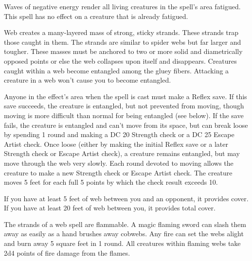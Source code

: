 \begin{multicols}{2}
\begin{small}
\noindent Waves of negative energy render all living creatures in the spell's area fatigued. This spell has no effect on a creature that is already fatigued.

\noindent Web creates a many-layered mass of strong, sticky strands. These strands trap those caught in them. The strands are similar to spider webs but far larger and tougher. These masses must be anchored to two or more solid and diametrically opposed points or else the web collapses upon itself and disappears. Creatures caught within a web become entangled among the gluey fibers. Attacking a creature in a web won't cause you to become entangled.

\smallskip\noindent Anyone in the effect's area when the spell is cast must make a Reflex save. If this save succeeds, the creature is entangled, but not prevented from moving, though moving is more difficult than normal for being entangled (see below). If the save fails, the creature is entangled and can't move from its space, but can break loose by spending 1 round and making a DC 20 Strength check or a DC 25 Escape Artist check. Once loose (either by making the initial Reflex save or a later Strength check or Escape Artist check), a creature remains entangled, but may move through the web very slowly. Each round devoted to moving allows the creature to make a new Strength check or Escape Artist check. The creature moves 5 feet for each full 5 points by which the check result exceeds 10.

\smallskip\noindent If you have at least 5 feet of web between you and an opponent, it provides cover. If you have at least 20 feet of web between you, it provides total cover.

\smallskip\noindent The strands of a web spell are flammable. A magic flaming sword can slash them away as easily as a hand brushes away cobwebs. Any fire can set the webs alight and burn away 5 square feet in 1 round. All creatures within flaming webs take 2d4 points of fire damage from the flames.


\end{small}
\end{multicols}
